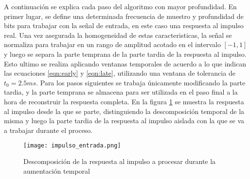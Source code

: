A continuación se explica cada paso del algoritmo con mayor profundidad.
En primer lugar, se define una determinada frecuencia de muestro y profundidad de bits para trabajar con la señal de entrada, en este caso una respuesta al impulso real. Una vez asegurada la homogeneidad de estas caracteristicas, la señal se normaliza para trabajar en un rango de amplitud acotado en el intervalo $[-1,1]$ y luego se separa la parte temprana de la parte tardia de la respuesta al impulso. Esto ultimo se realiza aplicando ventanas temporales de acuerdo a lo que indican las ecuaciones \ref{eqn:early} y \ref{eqn:late}, utilizando una ventana de tolerancia de $t_{0} = 2.5 ms$. Para los pasos siguientes se trabaja únicamente modificando la parte tardia, y la parte temprana se almacena para ser utilizada en el paso final a la hora de reconstruir la respuesta completa. En la figura \ref{fig:impulso_entrada} se  muestra la respuesta al impulso desde la que se parte, distinguiendo la descomposición temporal de la misma y luego la parte tardia de la respuesta al impulso aislada con la que se va a trabajar durante el proceso.

\begin{figure}[H]
	\centering{}
	\texttt{[image: impulso\_entrada.png]}
	\caption{Descomposición de la respuesta al impulso a procesar durante la aumentación temporal}
	\label{fig:impulso_entrada}
\end{figure}

